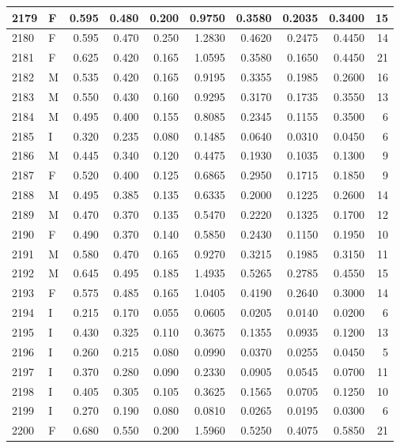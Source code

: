 \documentclass[9pt,twocolumn,twoside,]{pnas-new}
\begin{document}
\begin{tabular}{l|l|r|r|r|r|r|r|r|r}
\hline
2179 & F & 0.595 & 0.480 & 0.200 & 0.9750 & 0.3580 & 0.2035 & 0.3400 & 15\\
\hline
2180 & F & 0.595 & 0.470 & 0.250 & 1.2830 & 0.4620 & 0.2475 & 0.4450 & 14\\
\hline
2181 & F & 0.625 & 0.420 & 0.165 & 1.0595 & 0.3580 & 0.1650 & 0.4450 & 21\\
\hline
2182 & M & 0.535 & 0.420 & 0.165 & 0.9195 & 0.3355 & 0.1985 & 0.2600 & 16\\
\hline
2183 & M & 0.550 & 0.430 & 0.160 & 0.9295 & 0.3170 & 0.1735 & 0.3550 & 13\\
\hline
2184 & M & 0.495 & 0.400 & 0.155 & 0.8085 & 0.2345 & 0.1155 & 0.3500 & 6\\
\hline
2185 & I & 0.320 & 0.235 & 0.080 & 0.1485 & 0.0640 & 0.0310 & 0.0450 & 6\\
\hline
2186 & M & 0.445 & 0.340 & 0.120 & 0.4475 & 0.1930 & 0.1035 & 0.1300 & 9\\
\hline
2187 & F & 0.520 & 0.400 & 0.125 & 0.6865 & 0.2950 & 0.1715 & 0.1850 & 9\\
\hline
2188 & M & 0.495 & 0.385 & 0.135 & 0.6335 & 0.2000 & 0.1225 & 0.2600 & 14\\
\hline
2189 & M & 0.470 & 0.370 & 0.135 & 0.5470 & 0.2220 & 0.1325 & 0.1700 & 12\\
\hline
2190 & F & 0.490 & 0.370 & 0.140 & 0.5850 & 0.2430 & 0.1150 & 0.1950 & 10\\
\hline
2191 & M & 0.580 & 0.470 & 0.165 & 0.9270 & 0.3215 & 0.1985 & 0.3150 & 11\\
\hline
2192 & M & 0.645 & 0.495 & 0.185 & 1.4935 & 0.5265 & 0.2785 & 0.4550 & 15\\
\hline
2193 & F & 0.575 & 0.485 & 0.165 & 1.0405 & 0.4190 & 0.2640 & 0.3000 & 14\\
\hline
2194 & I & 0.215 & 0.170 & 0.055 & 0.0605 & 0.0205 & 0.0140 & 0.0200 & 6\\
\hline
2195 & I & 0.430 & 0.325 & 0.110 & 0.3675 & 0.1355 & 0.0935 & 0.1200 & 13\\
\hline
2196 & I & 0.260 & 0.215 & 0.080 & 0.0990 & 0.0370 & 0.0255 & 0.0450 & 5\\
\hline
2197 & I & 0.370 & 0.280 & 0.090 & 0.2330 & 0.0905 & 0.0545 & 0.0700 & 11\\
\hline
2198 & I & 0.405 & 0.305 & 0.105 & 0.3625 & 0.1565 & 0.0705 & 0.1250 & 10\\
\hline
2199 & I & 0.270 & 0.190 & 0.080 & 0.0810 & 0.0265 & 0.0195 & 0.0300 & 6\\
\hline
2200 & F & 0.680 & 0.550 & 0.200 & 1.5960 & 0.5250 & 0.4075 & 0.5850 & 21\\

\end{tabular}
\end{document}
